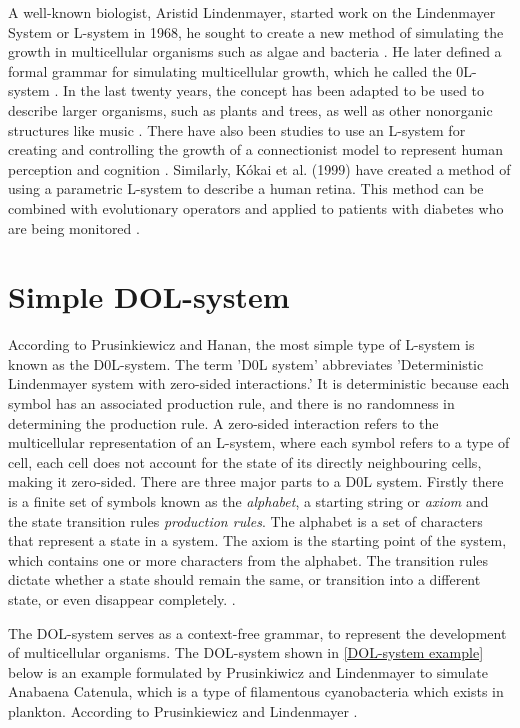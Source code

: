 A well-known biologist, Aristid Lindenmayer, started work on the Lindenmayer System or L-system in 1968, he sought to create a new method of simulating the growth in multicellular organisms such as algae and bacteria \cite{lindenmayer1968mathematical}. He later defined a formal grammar for simulating multicellular growth, which he called the 0L-system \cite {lindenmayer1971developmental}. In the last twenty years, the concept has been adapted to be used to describe larger organisms, such as plants and trees, as well as other nonorganic structures like music \cite{worth2005growing}. There have also been studies to use an L-system for creating and controlling the growth of a connectionist model to represent human perception and cognition \cite{vaario1991connectionist}. Similarly, K{\'o}kai et al. (1999) have created a method of using a parametric L-system to describe a human retina. This method can be combined with evolutionary operators and applied to patients with diabetes who are being monitored \cite{kokai1999parametric}.

\section{Simple DOL-system} \label{Simple DOL-systems}

According to Prusinkiewicz and Hanan, the most simple type of L-system is known as the D0L-system. The term 'D0L system' abbreviates 'Deterministic Lindenmayer system with zero-sided interactions.' It is deterministic because each symbol has an associated production rule, and there is no randomness in determining the production rule. A zero-sided interaction refers to the multicellular representation of an L-system, where each symbol refers to a type of cell, each cell does not account for the state of its directly neighbouring cells, making it zero-sided. There are three major parts to a D0L system. Firstly there is a finite set of symbols known as the \textit{alphabet}, a starting string or \textit{axiom} and the state transition rules \textit{production rules}. The alphabet is a set of characters that represent a state in a system. The axiom is the starting point of the system, which contains one or more characters from the alphabet. The transition rules dictate whether a state should remain the same, or transition into a different state, or even disappear completely. \cite{prusinkiewicz2013lindenmayer}. 

The DOL-system serves as a context-free grammar, to represent the development of multicellular organisms. The DOL-system shown in \ref{DOL-system example} below is an example formulated by Prusinkiwicz and Lindenmayer to simulate Anabaena Catenula, which is a type of filamentous cyanobacteria which exists in plankton. According to Prusinkiewicz and Lindenmayer  \cite{prusinkiewicz2012algorithmic}.

